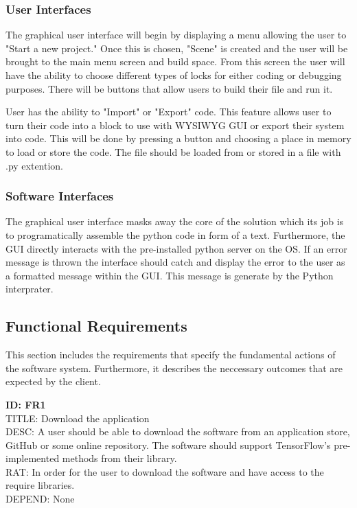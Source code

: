 \documentclass[journal,10pt,onecolumn,compsoc]{IEEEtran} \usepackage[margin=1.0in]{geometry} \usepackage{pdfpages} \usepackage{graphicx}
\begin{document}
\subsubsection{User Interfaces}

The graphical user interface will begin by displaying a menu allowing the user to "Start a new project."
Once this is chosen, "Scene" is created and the user will be brought to the main menu screen and build space.
From this screen the user will have the ability to choose different types of locks for either coding or debugging purposes.
There will be buttons that allow users to build their file and run it.

User has the ability to "Import" or "Export" code.
This feature allows user to turn their code into a block to use with WYSIWYG GUI or export their system into code.
This will be done by pressing a button and choosing a place in memory to load or store the code. 
The file should be loaded from or stored in a file with .py extention.

\subsubsection{Software Interfaces}

The graphical user interface masks away the core of the solution which its job is to programatically assemble the python code in form of a text.
Furthermore, the GUI directly interacts with the pre-installed python server on the OS.
If an error message is thrown the interface should catch and display the error to the user as a formatted message within the GUI.
This message is generate by the Python interprater.

\subsection{Functional Requirements}

This section includes the requirements that specify the fundamental actions of the software system.
Furthermore, it describes the neccessary outcomes that are expected by the client.

\noindent
\textbf{ID: FR1}\\
TITLE: Download the application\\
DESC: A user should be able to download the software from an application store, GitHub or some online repository. 
The software should support TensorFlow\texttrademark's pre-implemented methods from their library. \\
RAT: In order for the user to download the software and have access to the require libraries.\\
DEPEND: None\\
\end{document}

